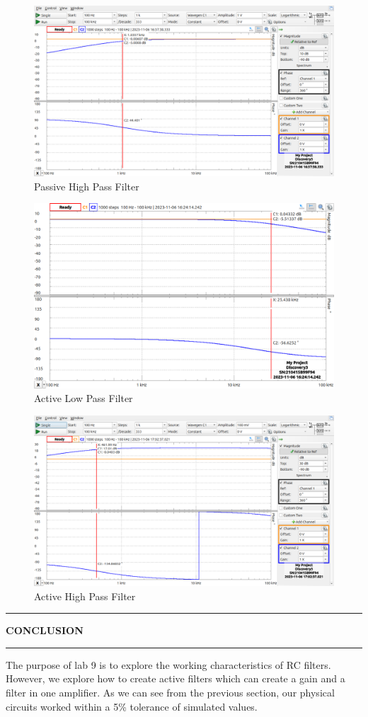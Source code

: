 \documentclass{article}
\begin{document}
\begin{figure}[H]
    \centering
    \includegraphics[width=1\textwidth]{3inlab.png}
    \caption{Passive High Pass Filter}
\end{figure}

\begin{figure}[H]
    \centering
    \includegraphics[width=1\textwidth]{2inlab.png}
    \caption{Active Low Pass Filter}
\end{figure}

\begin{figure}[H]
    \centering
    \includegraphics[width=1\textwidth]{4inlab.png}
    \caption{Active High Pass Filter}
\end{figure}
\begin{center}
    \hrule
    \vspace{0.2cm}
    \textbf{\large CONCLUSION}
    \vspace{0.2cm}
    \hrule
\end{center}

The purpose of lab 9 is to explore the working characteristics of RC filters.
However, we explore how to create active filters which can create a gain and a filter in one amplifier.
As we can see from the previous section, our physical circuits worked within a 5\% tolerance of simulated values.
\end{document}
